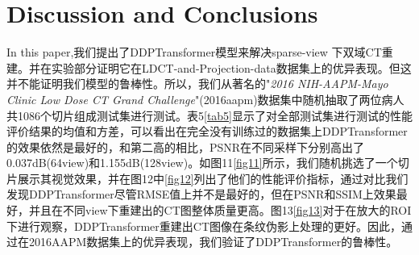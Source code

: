 \section{Discussion and Conclusions}
In this paper,我们提出了DDPTransformer模型来解决sparse-view 下双域CT重建。并在实验部分证明它在LDCT-and-Projection-data数据集上的优异表现。但这并不能证明我们模型的鲁棒性。所以，我们从著名的"\emph{2016 NIH-AAPM-Mayo Clinic Low Dose CT Grand Challenge}"(2016aapm)\cite{mccollough2016tu}数据集中随机抽取了两位病人共1086个切片组成测试集进行测试。表5\ref{tab5}显示了对全部测试集进行测试的性能评价结果的均值和方差，可以看出在完全没有训练过的数据集上DDPTransformer的效果依然是最好的，和第二高的相比，PSNR在不同采样下分别高出了0.037dB(64view)和1.155dB(128view)。如图11\ref{fig11}所示，我们随机挑选了一个切片展示其视觉效果，并在图12中\ref{fig12}列出了他们的性能评价指标，通过对比我们发现DDPTransformer尽管RMSE值上并不是最好的，但在PSNR和SSIM上效果最好，并且在不同view下重建出的CT图整体质量更高。图13\ref{fig13}对于在放大的ROI下进行观察，DDPTransformer重建出CT图像在条纹伪影上处理的更好。因此，通过在2016AAPM数据集上的优异表现，我们验证了DDPTransformer的鲁棒性。\par
